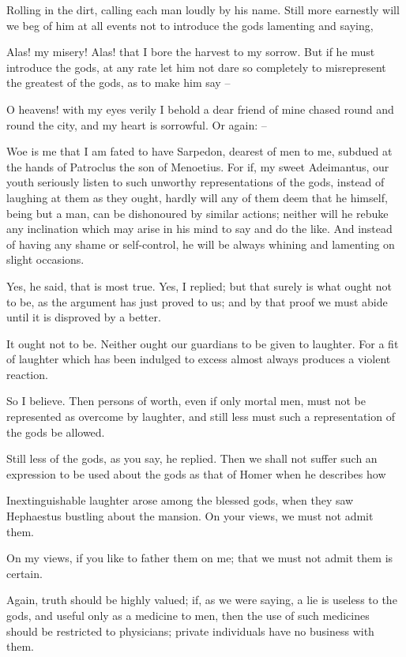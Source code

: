 Rolling in the dirt, calling each man loudly by his name. Still more earnestly will we beg of him at all events not to introduce the gods lamenting and saying,

Alas! my misery! Alas! that I bore the harvest to my sorrow. But if he must introduce the gods, at any rate let him not dare so completely to misrepresent the greatest of the gods, as to make him say --

O heavens! with my eyes verily I behold a dear friend of mine chased round and round the city, and my heart is sorrowful. Or again: --

Woe is me that I am fated to have Sarpedon, dearest of men to me, subdued at the hands of Patroclus the son of Menoetius. For if, my sweet Adeimantus, our youth seriously listen to such unworthy representations of the gods, instead of laughing at them as they ought, hardly will any of them deem that he himself, being but a man, can be dishonoured by similar actions; neither will he rebuke any inclination which may arise in his mind to say and do the like. And instead of having any shame or self-control, he will be always whining and lamenting on slight occasions.

Yes, he said, that is most true.
Yes, I replied; but that surely is what ought not to be, as the argument has just proved to us; and by that proof we must abide until it is disproved by a better.

It ought not to be.
Neither ought our guardians to be given to laughter. For a fit of laughter which has been indulged to excess almost always produces a violent reaction.

So I believe.
Then persons of worth, even if only mortal men, must not be represented as overcome by laughter, and still less must such a representation of the gods be allowed.

Still less of the gods, as you say, he replied.
Then we shall not suffer such an expression to be used about the gods as that of Homer when he describes how

Inextinguishable laughter arose among the blessed gods, when they saw Hephaestus bustling about the mansion. On your views, we must not admit them.

On my views, if you like to father them on me; that we must not admit them is certain.

Again, truth should be highly valued; if, as we were saying, a lie is useless to the gods, and useful only as a medicine to men, then the use of such medicines should be restricted to physicians; private individuals have no business with them.

